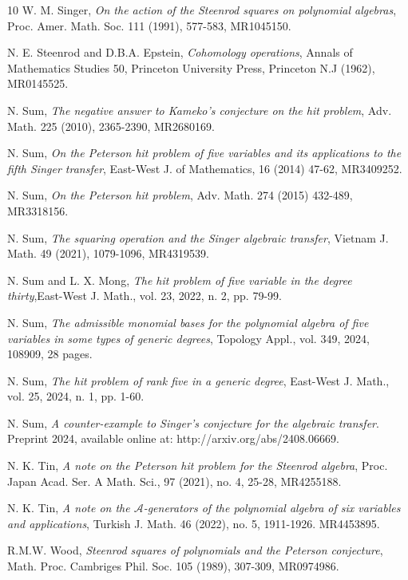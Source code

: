 \documentclass[reqno]{amsart}
\theoremstyle{plain}
\theoremstyle{definition}
\theoremstyle{plain}
\theoremstyle{definition}
\numberwithin{equation}{section}
\begin{document}
\begin{thebibliography}{10}
   W. M. Singer, \textit{On the action  of the Steenrod squares on polynomial algebras}, Proc. Amer. Math. Soc.  111 (1991), 577-583, MR1045150. 

  N. E. Steenrod and D.B.A. Epstein, \textit{Cohomology operations}, Annals of Mathematics Studies 50,  Princeton University Press, Princeton N.J (1962), MR0145525. 

  N. Sum, \textit{The negative answer to Kameko's conjecture on the hit problem}, Adv. Math. {225} (2010),  2365-2390, MR2680169.

 N. Sum, \textit{On the Peterson hit problem of five variables and its applications to the fifth Singer transfer}, East-West J. of Mathematics, 16 (2014) 47-62, MR3409252.

   N. Sum, \textit{On the Peterson hit problem}, Adv. Math. 274 (2015) 432-489, MR3318156.

  N. Sum, \textit{The squaring operation and the Singer algebraic transfer}, Vietnam J. Math. 49 (2021), 1079-1096, MR4319539.

 N. Sum and L. X. Mong, \textit{The hit problem of five variable in the degree thirty},East-West J. Math., vol. 23, 2022, n. 2, pp. 79-99.

 N. Sum, \textit{The admissible monomial bases for the polynomial algebra of five variables in some types of generic degrees}, Topology Appl., vol. 349, 2024, 108909, 28 pages.

 N. Sum, \textit{The hit problem of rank five in a generic degree}, East-West J. Math., vol. 25, 2024, n. 1, pp. 1-60. 

 N. Sum, \textit{A counter-example to Singer's conjecture for the algebraic transfer}. Preprint 2024, available online at: http://arxiv.org/abs/2408.06669.

  N. K. Tin, \textit{A note on the Peterson hit problem for the Steenrod algebra}, Proc. Japan Acad. Ser. A Math. Sci., 97 (2021), no. 4, 25-28, MR4255188.

  N. K. Tin, \textit{A note on the $\mathcal A$-generators of the polynomial algebra of six variables and applications}, Turkish J. Math. 46 (2022), no. 5, 1911-1926. MR4453895. 

  R.M.W. Wood, \textit{Steenrod squares of polynomials and the Peterson conjecture}, Math. Proc. Cambriges Phil. Soc. 105  (1989), 307-309, MR0974986. 

\end{thebibliography}
\end{document}
